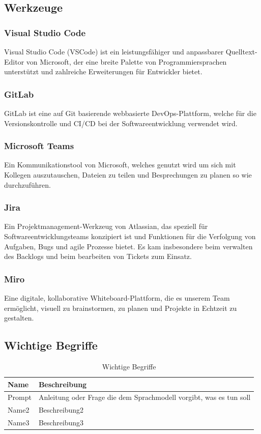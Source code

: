 \subsection{Werkzeuge}

\subsubsection{Visual Studio Code}
Visual Studio Code (VSCode) ist ein leistungsfähiger und anpassbarer Quelltext-Editor von Microsoft, der eine breite Palette von 
Programmiersprachen unterstützt und zahlreiche Erweiterungen für Entwickler bietet. 

\subsubsection{GitLab}
GitLab ist eine auf Git basierende webbasierte DevOps-Plattform, welche für die Versionskontrolle und CI/CD bei der Softwareentwicklung verwendet wird.

\subsubsection{Microsoft Teams}
Ein Kommunikationstool von Microsoft, welches genutzt wird um sich mit Kollegen auszutauschen, Dateien zu teilen und Besprechungen zu planen so wie durchzuführen.

\subsubsection{Jira}
Ein Projektmanagement-Werkzeug von Atlassian, das speziell für Softwareentwicklungsteams konzipiert ist und Funktionen für die Verfolgung von Aufgaben, Bugs und agile Prozesse bietet.
Es kam insbesondere beim verwalten des Backlogs und beim bearbeiten von Tickets zum Einsatz.

\subsubsection{Miro}
Eine digitale, kollaborative Whiteboard-Plattform, die es unserem Team ermöglicht, visuell zu brainstormen, zu planen und Projekte in Echtzeit zu gestalten.

\subsection{Wichtige Begriffe}

\begin{table}[H]
    \centering
    \caption{Wichtige Begriffe}
    \label{tab:technologien}
    \begin{tabular}{|l|l|}
    \hline
    \textbf{Name} & \textbf{Beschreibung} \\ \hline
    Prompt & Anleitung oder Frage die dem Sprachmodell vorgibt, was es tun soll \\ \hline
    Name2 & Beschreibung2 \\ \hline
    Name3 & Beschreibung3 \\ \hline
    \end{tabular}
\end{table}



